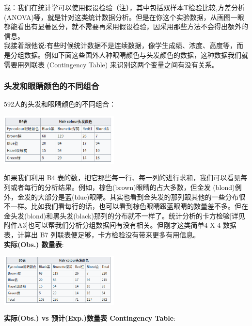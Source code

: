 我：我们在统计学可以使用假设检验（注），其中包括双样本T检验比较,方差分析(ANOVA)等，就是针对这类统计数据分析。但是在你这个实验数据，从画图一眼都能看出有显著区分，就不需要再采用假设检验，因采用那些方法不会得出额外的信息。\\

我接着跟他说:有些时候统计数据不是连续数据，像学生成绩、浓度、高度等，而是分组数据。例如下面这些国外人种眼睛颜色与头发颜色的数据，这种数据我们就需要用列联表 (Contingency Table) 来识别这两个变量之间有没有关系。\\

\hypertarget{ux5934ux53d1ux548cux773cux775bux989cux8272ux7684ux4e0dux540cux7ec4ux5408}{%
\subsubsection{头发和眼睛颜色的不同组合}\label{ux5934ux53d1ux548cux773cux775bux989cux8272ux7684ux4e0dux540cux7ec4ux5408}}

592人的头发和眼睛颜色的不同组合：

\includegraphics[width=6cm]{Screenshotfrom2023-01-0222-19-18.png}

如果我们利用 B4
表的数，把它那些每一行、每一列的进行求和，我们可以看见每列或者每行的分析结果。例如，棕色(brown)眼睛的占大多数，但金发
(blond)例外，金发的大部分是蓝(blue)眼睛。其实也看到金头发的那列跟其他的一些分布很不一样。比如我们看每行的话，也可以看到棕色眼睛跟蓝眼睛的数量差不多。但在金头发(blond)和黑头发(black)那列的分布就不一样了。统计分析的卡方检验{[}详见附件A3{]}也可以帮我们分析分组数据间有没有相关。但刚才这类简单4
X 4 数据表，计算出 B7 列联表便足够，卡方检验没有带来更多有用信息。\\
\textbf{实际(Obs.) 数量表}:

\includegraphics[width=6cm]{Screenshotfrom2023-01-0222-20-05.png}


\textbf{实际(Obs.) vs 预计(Exp.)数量表 Contingency Table}:

